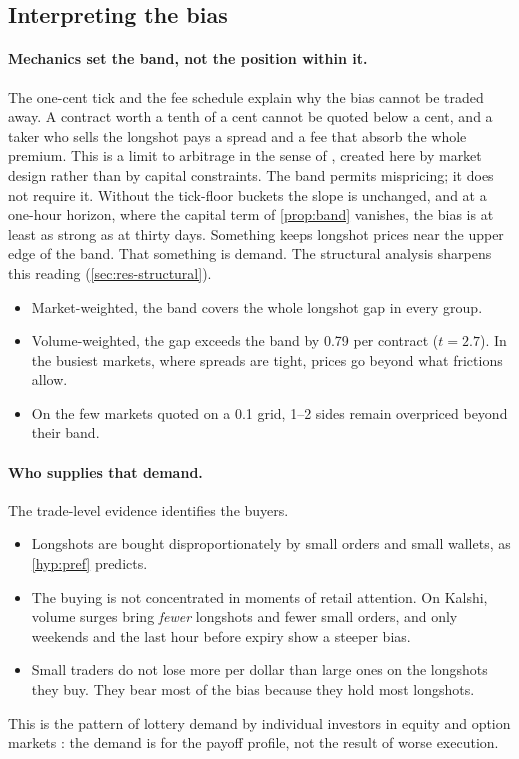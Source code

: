 \subsection{Interpreting the bias}

\paragraph{Mechanics set the band, not the position within it.} The one-cent tick and the fee
schedule explain why the bias cannot be traded away. A contract worth a tenth of a cent cannot be
quoted below a cent, and a taker who sells the longshot pays a spread and a fee that absorb the
whole premium. This is a limit to arbitrage in the sense of \citet{shleifervishny1997}, created
here by market design rather than by capital constraints. The band permits mispricing; it does not
require it. Without the tick-floor buckets the slope is unchanged, and at a one-hour horizon,
where the capital term of \cref{prop:band} vanishes, the bias is at least as strong as at thirty
days. Something keeps longshot prices near the upper edge of the band. That something is demand.
The structural analysis sharpens this reading (\cref{sec:res-structural}).
\begin{itemize}
  \item Market-weighted, the band covers the whole longshot gap in every group.
  \item Volume-weighted, the gap exceeds the band by 0.79\cents{} per contract ($t=2.7$). In the
  busiest markets, where spreads are tight, prices go beyond what frictions allow.
  \item On the few markets quoted on a 0.1\cents{} grid, 1--2\cents{} sides remain overpriced beyond
  their band.
\end{itemize}

\paragraph{Who supplies that demand.} The trade-level evidence identifies the buyers.
\begin{itemize}
  \item Longshots are bought disproportionately by small orders and small wallets, as
  \cref{hyp:pref} predicts.
  \item The buying is not concentrated in moments of retail attention. On Kalshi, volume surges
  bring \emph{fewer} longshots and fewer small orders, and only weekends and the last hour before
  expiry show a steeper bias.
  \item Small traders do not lose more per dollar than large ones on the longshots they buy. They
  bear most of the bias because they hold most longshots.
\end{itemize}
This is the pattern of lottery demand by individual investors in equity and option markets
\citep{kumar2009,bryzgalova2023}: the demand is for the payoff profile, not the result of worse
execution.

